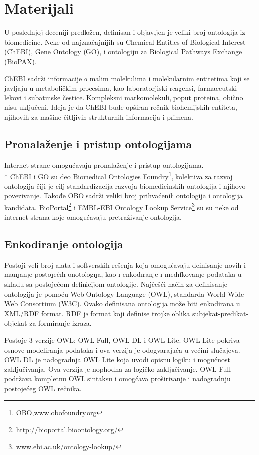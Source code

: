 \section{Materijali}

U poslednjoj deceniji predložen, definisan i objavljen je veliki broj ontologija iz biomedicine.
Neke od najznačajnijih su Chemical Entities of Biological Interest (ChEBI), Gene Ontology (GO), 
i ontologiju za Biological Pathways Exchange (BioPAX). \par
 ChEBI sadrži informacije o malim molekulima i molekularnim entitetima 
koji se javljaju u metaboličkim procesima, kao laboratorjiski reagensi, farmaceutski lekovi i subatmske čestice.
 Kompleksni markomolekuli, poput proteina, obično nisu uključeni. Ideja je da ChEBI bude opširan rečnik biohemijskih entiteta, njihovih
za mašine čitljivih strukturnih informacija i primena.

\subsection{Pronalaženje i pristup ontologijama}

Internet strane omogućavaju pronalaženje i pristup ontologijama.\\*
ChEBI i GO su deo Biomedical Ontologies Foundry\footnote{OBO,\url{www.obofoundry.org}}, kolektiva za razvoj ontologija čiji je cilj standardizacija razvoja biomedicinskih ontologija i njihovo povezivanje. 
Takođe OBO sadrži veliki broj prihvaćenih ontologija i ontologija kandidata.
BioPortal\footnote{ \url{http://bioportal.bioontology.org/}} i EMBL-EBI Ontology Lookup Service\footnote{ \url{www.ebi.ac.uk/ontology-lookup/}}
su su neke od internet strana koje omogućavaju pretraživanje ontologija.

\subsection{Enkodiranje ontologija}

Postoji veli broj alata i softverskih rešenja koja omogućavaju deinisanje novih i manjanje postojećih onotologija, kao i 
enkodiranje i modifkovanje podataka u skladu sa postojećom definicijom ontologije.
Najčešći način za definisanje ontologija je pomoću Web Ontology Language (OWL), standarda World Wide Web Consortium (W3C).
Ovako definisana ontologija može biti enkodirana u XML/RDF format. RDF je format koji definise trojke oblika subjekat-predikat-objekat
za formiranje izraza. \par
Postoje 3 verzije OWL: OWL Full, OWL DL i OWL Lite.
OWL Lite pokriva osnove modeliranja podataka i ova verzija je odogvarajuća u većini slučajeva.
OWL DL je nadogradnja OWL Lite koja uvodi opisnu logiku i mogućnost zaključivanja. Ova verzija je nophodna za logičko zaključivanje.
OWL Full podržava kompletnu OWL sintaksu i omogćava proširivanje i nadogradnju postojećeg OWL rečnika.

